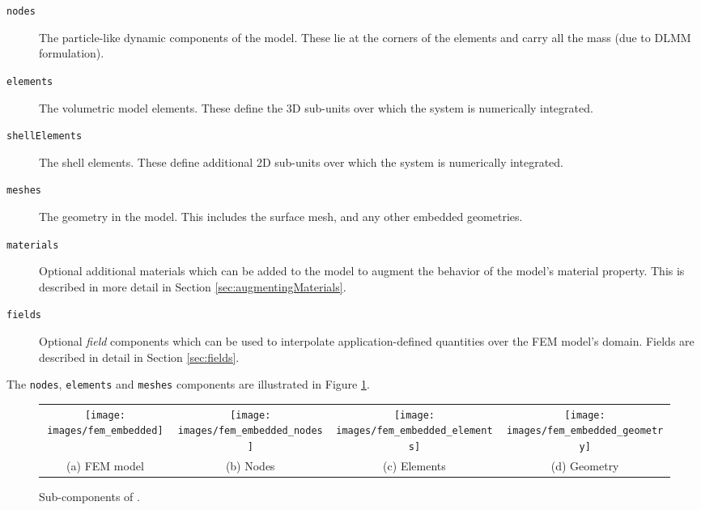 \begin{description}
\item[{\tt nodes}]\mbox{}

The particle-like dynamic components of the model.  These lie at the corners
of the elements and carry all the mass (due to DLMM formulation).

\item[{\tt elements}]\mbox{}

The volumetric model elements. These define the 3D 
sub-units over which the system is numerically integrated.

\item[{\tt shellElements}]\mbox{}

The shell elements. These define additional 2D sub-units
over which the system is numerically integrated.

\item[{\tt meshes}]\mbox{}

The geometry in the model.  This includes the surface mesh, and any other
embedded geometries.

\item[{\tt materials}]\mbox{}

Optional additional materials which can be added to the
model to augment the behavior of the 
model's {\sf material} property. This is described in more detail
in Section \ref{sec:augmentingMaterials}.

\item[{\tt fields}]\mbox{}

Optional {\it field} components which can be used to interpolate
application-defined quantities over the FEM model's domain. Fields are
described in detail in Section \ref{sec:fields}.

\end{description}

The {\tt nodes}, {\tt elements} and {\tt meshes} components are
illustrated in Figure \ref{fig:fem}.

\begin{figure}[ht]
\centering
{}
\begin{tabular}{cccc}
\texttt{[image: images/fem\_embedded]} & 
\texttt{[image: images/fem\_embedded\_nodes]} &
\texttt{[image: images/fem\_embedded\_elements]} &
\texttt{[image: images/fem\_embedded\_geometry]}\\
(a) FEM model & (b) Nodes & (c) Elements & (d) Geometry
\end{tabular}
\caption{
Sub-components of . 
\label{fig:fem}}
\end{figure}

